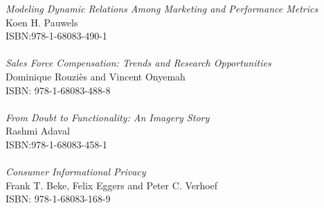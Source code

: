 \vspace{12pt}
\noindent \textit{Modeling Dynamic Relations Among Marketing and Performance Metrics}\\
Koen H. Pauwels \\
ISBN:978-1-68083-490-1\\
\\
\noindent \textit{Sales Force Compensation: Trends and Research Opportunities}\\
Dominique Rouziès and Vincent Onyemah\\
ISBN: 978-1-68083-488-8\\
\\
\noindent \textit{From Doubt to Functionality: An Imagery Story}\\
Rashmi Adaval\\
ISBN:978-1-68083-458-1\\
\\
\noindent \textit{Consumer Informational Privacy}\\
Frank T. Beke, Felix Eggers and Peter C. Verhoef \\
ISBN: 978-1-68083-168-9
